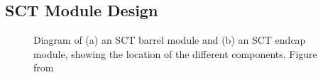 
\subsection{SCT Module Design}

\begin{figure}[h]
\centering
\centering
\caption[Diagram of (a) an SCT barrel module and (b) an SCT endcap module.]
{Diagram of (a) an SCT barrel module and (b) an SCT endcap module, showing the
location of the different components. Figure
from~\cite{1748-0221-3-08-S08003}}
\label{fig:module-diagram}
\end{figure}

